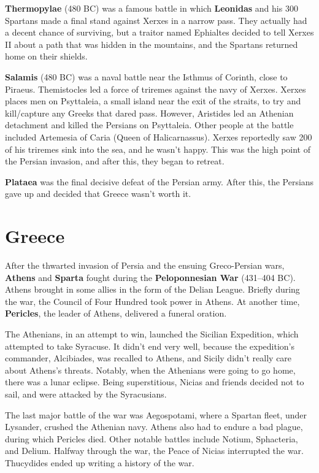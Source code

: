 \textbf{Thermopylae} (480 BC) was a famous battle in which \textbf{Leonidas} and his 300 Spartans
made a final stand against Xerxes in a narrow pass.
They actually had a decent chance of surviving,
but a traitor named Ephialtes decided to tell Xerxes II about a path that
was hidden in the mountains, and the Spartans returned home on their shields.

\textbf{Salamis} (480 BC) was a naval battle near the Isthmus of Corinth, close to Piraeus.
Themistocles led a force of triremes against the navy of Xerxes.
Xerxes places men on Psyttaleia, a small island near the exit of the straits,
to try and kill/capture any Greeks that dared pass.
However, Aristides led an Athenian detachment and killed the Persians on Psyttaleia.
Other people at the battle included Artemesia of Caria (Queen of Halicarnassus).
Xerxes reportedly saw 200 of his triremes sink into the sea, and he wasn't happy.
This was the high point of the Persian invasion, and after this, they began to retreat.

\textbf{Plataea} was the final decisive defeat of the Persian army.
After this, the Persians gave up and decided that Greece wasn't worth it.

\section{Greece}

After the thwarted invasion of Persia and the ensuing Greco-Persian wars,
\textbf{Athens} and \textbf{Sparta} fought during the \textbf{Peloponnesian War} (431--404 BC).
Athens brought in some allies in the form of the Delian League.
Briefly during the war, the Council of Four Hundred took power in Athens.
At another time, \textbf{Pericles}, the leader of Athens, delivered a funeral oration.

The Athenians, in an attempt to win, launched the Sicilian Expedition, which attempted to take Syracuse.
It didn't end very well, because the expedition's commander, Alcibiades, was recalled to Athens,
and Sicily didn't really care about Athens's threats.
Notably, when the Athenians were going to go home, there was a lunar eclipse.
Being superstitious, Nicias and friends decided not to sail, and were attacked by the Syracusians.

The last major battle of the war was Aegospotami, where a Spartan fleet,
under Lysander, crushed the Athenian navy.
Athens also had to endure a bad plague, during which Pericles died.
Other notable battles include Notium, Sphacteria, and Delium.
Halfway through the war, the Peace of Nicias interrupted the war.
Thucydides ended up writing a history of the war.


